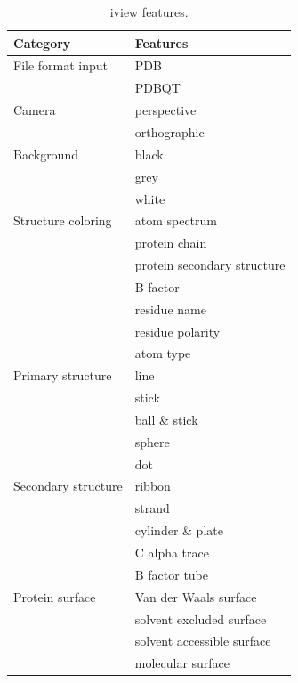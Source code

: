 \begin{table}
\caption{iview features.}
\label{tbl:features}
\begin{tabular}{ll}
\hline
                 Category & Features\\
\hline
        File format input & PDB\\
                          & PDBQT\\
\hline
                   Camera & perspective\\
                          & orthographic\\
\hline
               Background & black\\
                          & grey\\
                          & white\\
\hline
       Structure coloring & atom spectrum\\
                          & protein chain\\
                          & protein secondary structure\\
                          & B factor\\
                          & residue name\\
                          & residue polarity\\
                          & atom type\\
\hline
        Primary structure & line\\
                          & stick\\
                          & ball \& stick\\
                          & sphere\\
                          & dot\\
\hline
      Secondary structure & ribbon\\
                          & strand\\
                          & cylinder \& plate\\
                          & C alpha trace\\
                          & B factor tube\\
\hline
          Protein surface & Van der Waals surface\\
                          & solvent excluded surface\\
                          & solvent accessible surface\\
                          & molecular surface\\

\end{tabular}
\end{table}
